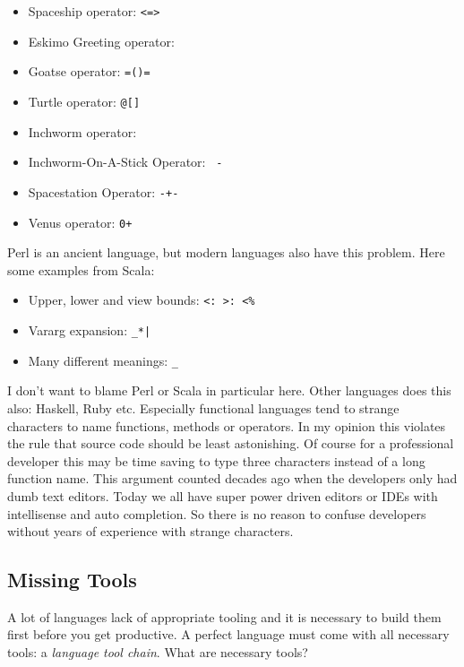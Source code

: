 \documentclass[11pt, a4paper]{report}
\begin{document}
\begin{itemize}
    \item Spaceship operator: \texttt{<=>}
    \item Eskimo Greeting operator: \texttt{}{}
    \item Goatse operator: \texttt{=()=}
    \item Turtle operator: \texttt{@{[]}}
    \item Inchworm operator: \texttt{~~}
    \item Inchworm-On-A-Stick Operator: \texttt{~-}
    \item Spacestation Operator: \texttt{-+-}
    \item Venus operator: \texttt{0+}
\end{itemize}

Perl is an ancient language, but modern languages also have this problem. Here some examples from Scala\cite{special-operators-scala}:

\begin{itemize}
    \item Upper, lower and view bounds: \texttt{<: >: <\%}
    \item Vararg expansion: \texttt{\_*|}
    \item Many different meanings: \texttt{\_}
\end{itemize}

I don't want to blame Perl or Scala in particular here. Other languages does this also: Haskell, Ruby etc. Especially functional languages tend to strange characters to name functions, methods or operators. In my opinion this violates the rule that source code should be least astonishing. Of course for a professional developer this may be time saving to type three characters instead of a long function name. This argument counted decades ago when the developers only had dumb text editors. Today we all have super power driven editors or IDEs with intellisense and auto completion. So there is no reason to confuse developers without years of experience with strange characters.

\subsection{Missing Tools}

A lot of languages lack of appropriate tooling and it is necessary to build them first before you get productive. A perfect language must come with all necessary tools: a \textit{language tool chain}. What are necessary tools?
\end{document}
